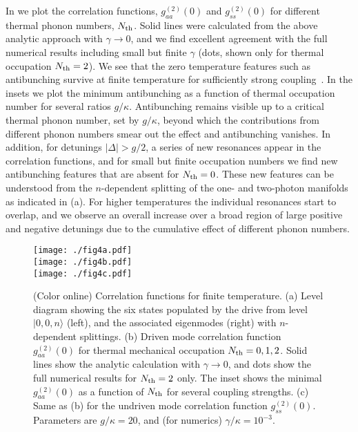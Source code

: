 In  we plot the correlation functions,
$g^{(2)}_{aa}(0)$ and $g^{(2)}_{ss}(0)$ for different thermal phonon numbers,
$N_{\rm th}$. 
Solid lines were calculated from the above
analytic approach with $\gamma \rightarrow 0$, 
and we find excellent agreement with
the full numerical results including small but finite
$\gamma$ (dots, shown only for
thermal occupation $N_{\rm th} = 2$).
We see that the zero temperature
features such as antibunching
survive at finite temperature for sufficiently strong coupling~\cite{Stannigel2012}.
In the insets we plot the minimum antibunching
as a function of thermal occupation number for
several ratios $g / \kappa$. 
Antibunching remains visible up
to a critical thermal phonon number, 
set by $g/\kappa$, 
beyond which the contributions from 
different phonon numbers smear out the effect
and antibunching vanishes.
In addition, for detunings $|\Delta|>g/2$, a series of new
resonances appear in the correlation functions, 
and for small but finite occupation numbers we  find
new antibunching features that are absent for $N_{\rm th}=0$.
These new features  can be understood from the $n$-dependent splitting of the
one- and two-photon manifolds as indicated in (a).
For higher temperatures the individual resonances start to overlap, and we
observe an overall increase over a broad region of large positive and negative
detunings due to the cumulative effect of different phonon numbers.
\begin{figure}[tb]
\centering
  \texttt{[image: ./fig4a.pdf]}\\
  \texttt{[image: ./fig4b.pdf]}\\
  \texttt{[image: ./fig4c.pdf]}
  \caption{
  \label{fig:thermal_g2}(Color online)
  Correlation functions for finite temperature. (a) Level diagram showing the
  six states populated by the drive from level $|0,0,n\rangle$ (left), 
  and the associated
  eigenmodes (right) with $n$-dependent splittings.
  (b) Driven mode correlation function $g^{(2)}_{aa}(0)$
  for thermal mechanical occupation $N_{\rm th} = 0,1,2$.
  Solid lines show the analytic calculation with $\gamma \rightarrow 0$,
   and  dots show the full numerical results for $N_{\rm th} = 2$ only.
  The inset shows the minimal $g^{(2)}_{aa}(0)$ as a function of $N_{\rm th}$ 
  for several
  coupling strengths. 
  (c) Same as (b) for the undriven mode correlation function $g^{(2)}_{ss}(0)$. 
  Parameters are $g/\kappa=20$, and (for numerics) $\gamma/\kappa =  10^{-3}$.
}
\end{figure} 


